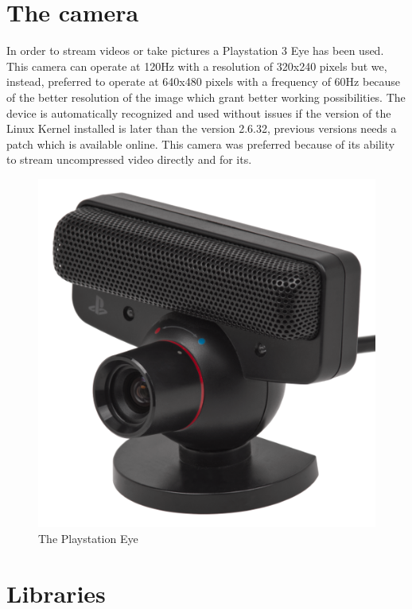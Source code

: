 \section{The camera}
In order to stream videos or take pictures a Playstation 3 Eye has been used.
This camera can operate at 120Hz with a resolution of 320x240 pixels but we, instead, preferred to operate at 640x480 pixels with a frequency of 60Hz because of the better resolution of the image which grant better working possibilities. The device is automatically recognized and used without issues if the version of the Linux Kernel installed is later than the version 2.6.32, previous versions needs a patch which is available online.
This camera was preferred because of its ability to stream uncompressed video directly \cite{pseyecompr} and for its.


\begin{figure}[hbt]
    \vspace{1cm}
    \centering
    \includegraphics{img/pseye.png}
    \caption{The Playstation Eye}
\end{figure}
 
\newpage
\section{Libraries}

